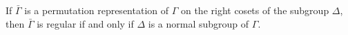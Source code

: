 If $\bar{\Gamma}$ is a permutation representation of $\Gamma$ on the right cosets of the subgroup $\Delta$, then $\bar{\Gamma}$ is regular if and only if $\Delta$ is a normal subgroup of $\Gamma$.

